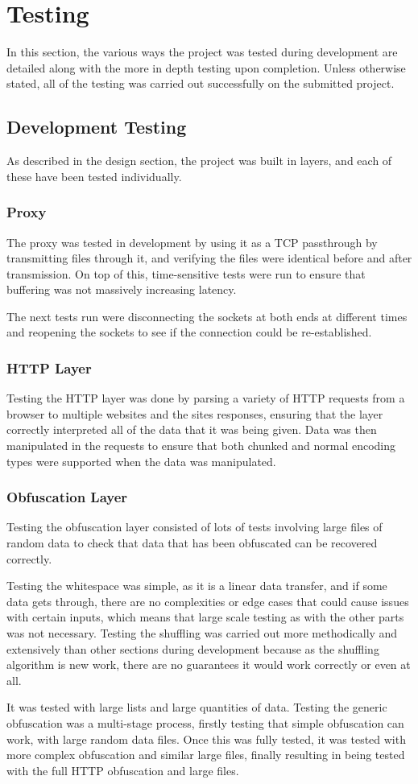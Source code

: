 \def\listingsfont{\ttfamily}
\section{Testing}
In this section, the various ways the project was tested during development are detailed along with the more in depth testing upon completion. Unless otherwise stated, all of the testing was carried out successfully on the submitted project.
\subsection{Development Testing}
As described in the design section, the project was built in layers, and each of these have been tested individually.
\subsubsection*{Proxy}
The proxy was tested in development by using it as a TCP passthrough by transmitting files through it, and verifying the files were identical before and after transmission.
On top of this, time-sensitive tests were run to ensure that buffering was not massively increasing latency.\par
The next tests run were disconnecting the sockets at both ends at different times and reopening the sockets to see if the connection could be re-established.\par
\subsubsection*{HTTP Layer}
Testing the HTTP layer was done by parsing a variety of HTTP requests from a browser to multiple websites and the sites responses, ensuring that the layer correctly interpreted all of the data that it was being given.
Data was then manipulated in the requests to ensure that both chunked and normal encoding types were supported when the data was manipulated.
\subsubsection*{Obfuscation Layer}
Testing the obfuscation layer consisted of lots of tests involving large files of random data to check that data that has been obfuscated can be recovered correctly.\par
Testing the whitespace was simple, as it is a linear data transfer, and if some data gets through, there are no complexities or edge cases that could cause issues with certain inputs, which means that large scale testing as with the other parts was not necessary.
Testing the shuffling was carried out more methodically and extensively than other sections during development because as the shuffling algorithm is new work, there are no guarantees it would work correctly or even at all.\par It was tested with large lists and large quantities of data.
Testing the generic obfuscation was a multi-stage process, firstly testing that simple obfuscation can work, with large random data files. Once this was fully tested, it was tested with more complex obfuscation and similar large files, finally resulting in being tested with the full HTTP obfuscation and large files.
